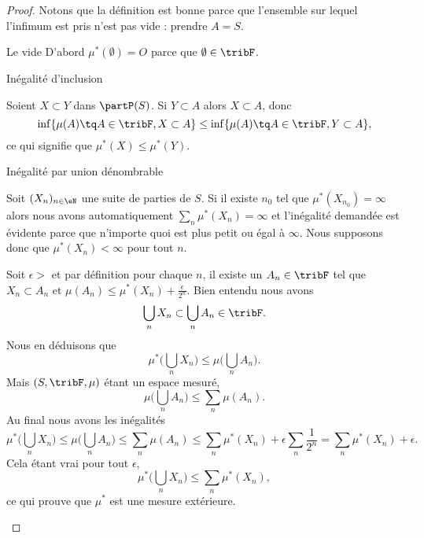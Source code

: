 \begin{proof}
    Notons que la définition est bonne parce que l'ensemble sur lequel l'infimum est pris n'est pas vide : prendre \( A=S\).
    \begin{subproof}
    \item[Le vide]
        D'abord \( \mu^*(\emptyset)=O\) parce que \( \emptyset\in\tribF\).
    \item[Inégalité d'inclusion]

        Soient \( X\subset Y\) dans \( \partP(S)\). Si \( Y\subset A\) alors \( X\subset A\), donc
        \begin{equation}
            \inf \{ \mu(A)\tq A\in\tribF,X\subset A \}\leq \inf \{ \mu(A)\tq A\in\tribF,Y\subset A \},
        \end{equation}
        ce qui signifie que \( \mu^*(X)\leq \mu^*(Y)\).
    \item[Inégalité par union dénombrable]

        Soit \( (X_n)_{n\in \eN}\) une suite de parties de \( S\). Si il existe \( n_0\) tel que \( \mu^*(X_{n_0})=\infty\) alors nous avons automatiquement \( \sum_n\mu^*(X_n)=\infty\) et l'inégalité demandée est évidente parce que n'importe quoi est plus petit ou égal à \( \infty\). Nous supposons donc que \( \mu^*(X_n)<\infty\) pour tout \( n\). 

        Soit \( \epsilon>\) et par définition pour chaque \( n\), il existe un \( A_n\in \tribF\) tel que \( X_n\subset A_n\) et \( \mu(A_n)\leq \mu^*(X_n)+\frac{ \epsilon }{ 2^n }\). Bien entendu nous avons
        \begin{equation}
            \bigcup_nX_n\subset \bigcup_nA_n\in\tribF.
        \end{equation}
        Nous en déduisons que
        \begin{equation}
            \mu^*\big( \bigcup_nX_n \big)\leq\mu\big( \bigcup_nA_n \big).
        \end{equation}
        Mais \( (S,\tribF,\mu)\) étant un espace mesuré,
        \begin{equation}
            \mu\big( \bigcup_nA_n \big)\leq \sum_n\mu(A_n).
        \end{equation}
        Au final nous avons les inégalités
        \begin{equation}
            \mu^*\big( \bigcup_nX_n \big)\leq \mu\big( \bigcup_nA_n \big)\leq\sum_n\mu(A_n)\leq \sum_n\mu^*(X_n)+\epsilon\sum_n\frac{1}{ 2^n }=\sum_n\mu^*(X_n)+\epsilon.
        \end{equation}
        Cela étant vrai pour tout \( \epsilon\),
        \begin{equation}
            \mu^*\big( \bigcup_nX_n \big)\leq\sum_n\mu^*(X_n),
        \end{equation}
        ce qui prouve que \( \mu^*\) est une mesure extérieure.


\end{subproof}
\end{proof}
